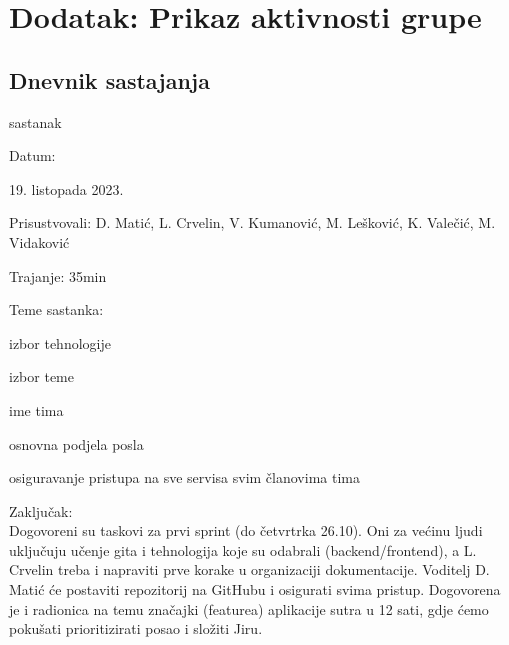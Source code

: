 \chapter*{Dodatak: Prikaz aktivnosti grupe}
		
		\section*{Dnevnik sastajanja}
		
		\begin{packed_enum}
			\item  sastanak
			
			\item[] \begin{packed_item}
				\item Datum: \date[{19. listopada 2023.}
				\item Prisustvovali: D. Matić, L. Crvelin, V. Kumanović, M. Lešković, K. Valečić, M. Vidaković
				\item Trajanje: 35min
				\item Teme sastanka:
				\begin{packed_item}
					\item  izbor tehnologije
					\item  izbor teme
                    \item  ime tima
                    \item  osnovna podjela posla
                    \item  osiguravanje pristupa na sve servisa svim članovima tima
				\end{packed_item}
            \item Zaključak: \\Dogovoreni su taskovi za prvi sprint (do četvrtrka 26.10). Oni za većinu ljudi uključuju učenje gita i tehnologija koje su odabrali (backend/frontend), a L. Crvelin treba i napraviti prve korake u organizaciji dokumentacije. Voditelj D. Matić će postaviti repozitorij na GitHubu i osigurati svima pristup. Dogovorena je i radionica na temu značajki (featurea) aplikacije sutra u 12 sati, gdje ćemo pokušati prioritizirati posao i složiti Jiru.
			\end{packed_item}


\end{packed_enum}
